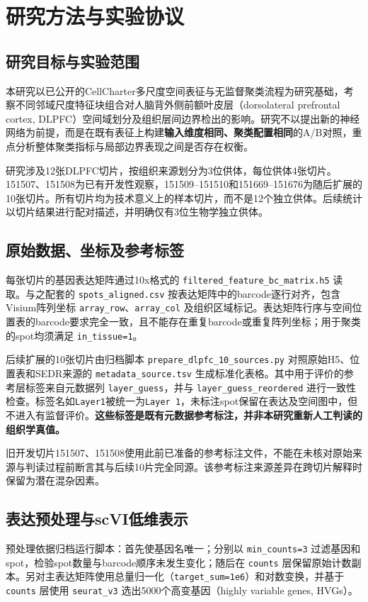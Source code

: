 \documentclass[UTF8,a4paper,12pt]{ctexart}
\begin{document}
\section{研究方法与实验协议}
\label{sec:method}

\subsection{研究目标与实验范围}
本研究以已公开的CellCharter多尺度空间表征与无监督聚类流程为研究基础，考察不同邻域尺度特征块组合对人脑背外侧前额叶皮层（dorsolateral prefrontal cortex, DLPFC）空间域划分及组织层间边界检出的影响。研究不以提出新的神经网络为前提，而是在既有表征上构建\textbf{输入维度相同、聚类配置相同}的A/B对照，重点分析整体聚类指标与局部边界表现之间是否存在权衡。

研究涉及12张DLPFC切片，按组织来源划分为3位供体，每位供体4张切片。151507、151508为已有开发性观察，151509--151510和151669--151676为随后扩展的10张切片。所有切片均为技术意义上的样本切片，而不是12个独立供体。后续统计以切片结果进行配对描述，并明确仅有3位生物学独立供体。

\subsection{原始数据、坐标及参考标签}
\label{subsec:source}
每张切片的基因表达矩阵通过10x格式的 \texttt{filtered\_feature\_bc\_matrix.h5} 读取。与之配套的 \texttt{spots\_aligned.csv} 按表达矩阵中的barcode逐行对齐，包含Visium阵列坐标 \texttt{array\_row}、\texttt{array\_col} 及组织区域标记。表达矩阵行序与空间位置表的barcode要求完全一致，且不能存在重复barcode或重复阵列坐标；用于聚类的spot均须满足 \texttt{in\_tissue=1}。

后续扩展的10张切片由归档脚本 \texttt{prepare\_dlpfc\_10\_sources.py} 对照原始H5、位置表和SEDR来源的 \texttt{metadata\_source.tsv} 生成标准化表格。其中用于评价的参考层标签来自元数据列 \texttt{layer\_guess}，并与 \texttt{layer\_guess\_reordered} 进行一致性检查。标签名如\texttt{Layer1}被统一为\texttt{Layer 1}，未标注spot保留在表达及空间图中，但不进入有监督评价。\textbf{这些标签是既有元数据参考标注，并非本研究重新人工判读的组织学真值。}

旧开发切片151507、151508使用此前已准备的参考标注文件，不能在未核对原始来源与判读过程前断言其与后续10片完全同源。该参考标注来源差异在跨切片解释时保留为潜在混杂因素。

\subsection{表达预处理与scVI低维表示}
\label{subsec:scvi}
预处理依据归档运行脚本：首先使基因名唯一；分别以 \texttt{min\_counts=3} 过滤基因和spot，检验spot数量与barcode顺序未发生变化；随后在 \texttt{counts} 层保留原始计数副本。另对主表达矩阵使用总量归一化（\texttt{target\_sum=1e6}）和对数变换，并基于 \texttt{counts} 层使用 \texttt{seurat\_v3} 选出5000个高变基因（highly variable genes, HVGs）。
\end{document}
